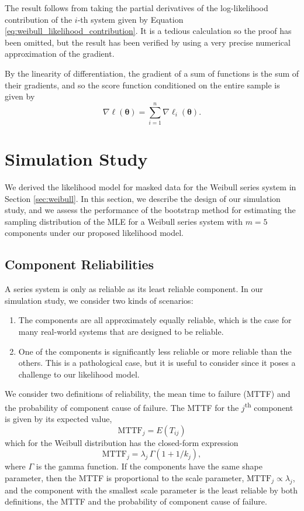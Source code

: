 \documentclass[
]{article}
\begin{document}
The result follows from taking the partial derivatives of the
log-likelihood contribution of the \(i\)-th system given by Equation
\eqref{eq:weibull_likelihood_contribution}. It is a tedious calculation
so the proof has been omitted, but the result has been verified by using
a very precise numerical approximation of the gradient.

By the linearity of differentiation, the gradient of a sum of functions
is the sum of their gradients, and so the score function conditioned on
the entire sample is given by \begin{equation}
\label{eq:weibull_series_score}
\nabla \ell(\boldsymbol{\theta}) = \sum_{i=1}^n \nabla \ell_i(\boldsymbol{\theta}).
\end{equation}

\hypertarget{simstudy}{%
\section{Simulation Study}\label{simstudy}}

We derived the likelihood model for masked data for the Weibull series
system in Section \ref{sec:weibull}. In this section, we describe the
design of our simulation study, and we assess the performance of the
bootstrap method for estimating the sampling distribution of the MLE for
a Weibull series system with \(m=5\) components under our proposed
likelihood model.

\hypertarget{sec:reliability}{%
\subsection{Component Reliabilities}\label{sec:reliability}}

A series system is only as reliable as its least reliable component. In
our simulation study, we consider two kinds of scenarios:

\begin{enumerate}
\def\labelenumi{\arabic{enumi}.}
\item
  The components are all approximately equally reliable, which is the
  case for many real-world systems that are designed to be reliable.
\item
  One of the components is significantly less reliable or more reliable
  than the others. This is a pathological case, but it is useful to
  consider since it poses a challenge to our likelihood model.
\end{enumerate}

We consider two definitions of reliability, the mean time to failure
(MTTF) and the probability of component cause of failure. The MTTF for
the \(j\)\textsuperscript{th} component is given by its expected value,
\[
\text{MTTF}_j = E(T_{i j})
\] which for the Weibull distribution has the closed-form expression \[
\text{MTTF}_j = \lambda_j \, \Gamma(1 + 1/k_j),
\] where \(\Gamma\) is the gamma function. If the components have the
same shape parameter, then the MTTF is proportional to the scale
parameter, \(\text{MTTF}_j \propto \lambda_j\), and the component with
the smallest scale parameter is the least reliable by both definitions,
the MTTF and the probability of component cause of failure.
\end{document}
